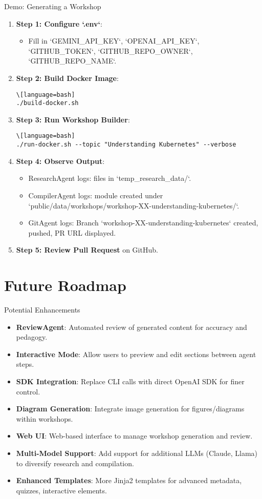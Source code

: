 \documentclass{beamer}
\begin{document}
\begin{frame}{Demo: Generating a Workshop}
\begin{enumerate}
\item \textbf{Step 1: Configure `.env`}:
\begin{itemize}
\item Fill in `GEMINI_API_KEY`, `OPENAI_API_KEY`, `GITHUB_TOKEN`, `GITHUB_REPO_OWNER`, `GITHUB_REPO_NAME`.
\end{itemize}
\item \textbf{Step 2: Build Docker Image}:
\begin{lstlisting}\[language=bash]
./build-docker.sh
\end{lstlisting}
\item \textbf{Step 3: Run Workshop Builder}:
\begin{lstlisting}\[language=bash]
./run-docker.sh --topic "Understanding Kubernetes" --verbose
\end{lstlisting}
\item \textbf{Step 4: Observe Output}:
\begin{itemize}
\item ResearchAgent logs: files in `temp_research_data/`.
\item CompilerAgent logs: module created under `public/data/workshops/workshop-XX-understanding-kubernetes/`.
\item GitAgent logs: Branch `workshop-XX-understanding-kubernetes` created, pushed, PR URL displayed.
\end{itemize}
\item \textbf{Step 5: Review Pull Request} on GitHub.
\end{enumerate}
\end{frame}

\section{Future Roadmap}

\begin{frame}{Potential Enhancements}
\begin{itemize}
\item \textbf{ReviewAgent}: Automated review of generated content for accuracy and pedagogy.
\item \textbf{Interactive Mode}: Allow users to preview and edit sections between agent steps.
\item \textbf{SDK Integration}: Replace CLI calls with direct OpenAI SDK for finer control.
\item \textbf{Diagram Generation}: Integrate image generation for figures/diagrams within workshops.
\item \textbf{Web UI}: Web-based interface to manage workshop generation and review.
\item \textbf{Multi-Model Support}: Add support for additional LLMs (Claude, Llama) to diversify research and compilation.
\item \textbf{Enhanced Templates}: More Jinja2 templates for advanced metadata, quizzes, interactive elements.
\end{itemize}
\end{frame}
\end{document}
